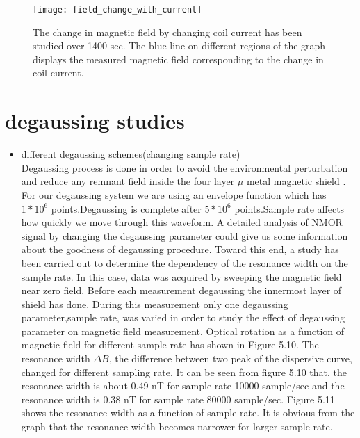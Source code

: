 \documentclass[12pt]{report}
\begin{document}
\begin{itemize}
   \begin{figure}[h]
\centering\texttt{[image: field\_change\_with\_current]}
\caption{The change in magnetic field  by changing coil current has been studied over 1400 sec. The blue line on different regions of the graph displays the measured magnetic field corresponding to the change in coil current. }
\end{figure}
   \end{itemize}
   \section{degaussing studies}  
   \begin{itemize}
   \item different degaussing schemes(changing sample rate)\\
Degaussing process is done in order to avoid the environmental perturbation and reduce any remnant field inside the four layer $\mu$ metal magnetic shield \cite{doi:10.1063/1.2713433}. For our degaussing system we are using an envelope function which has $1*10^6$ points.Degaussing is complete after $5*10^6$ points.Sample rate affects how quickly we move through this waveform. A detailed analysis of NMOR signal by changing the degaussing parameter could give us some information about the goodness of degaussing procedure. Toward this end, a study has been carried out to determine  the dependency of the resonance width on the sample rate. In this case, data was acquired by sweeping the magnetic field near zero field. Before each measurement degaussing the innermost layer of shield has done. During this measurement only one degaussing parameter,sample rate, was varied in order to study the effect of degaussing parameter on magnetic field measurement.  Optical rotation as a function of magnetic field for different sample rate has shown in Figure 5.10. The resonance width $\Delta B$, the difference between two peak of the dispersive curve, changed for different sampling rate. It can be seen from figure 5.10 that, the resonance width is about 0.49 nT for sample rate 10000 sample/sec and the resonance width is 0.38 nT for sample rate 80000 sample/sec. Figure 5.11 shows the resonance width as a function of sample rate. It is obvious from the graph that the resonance width becomes narrower for larger sample rate.    
   

\end{itemize}
\end{document}
